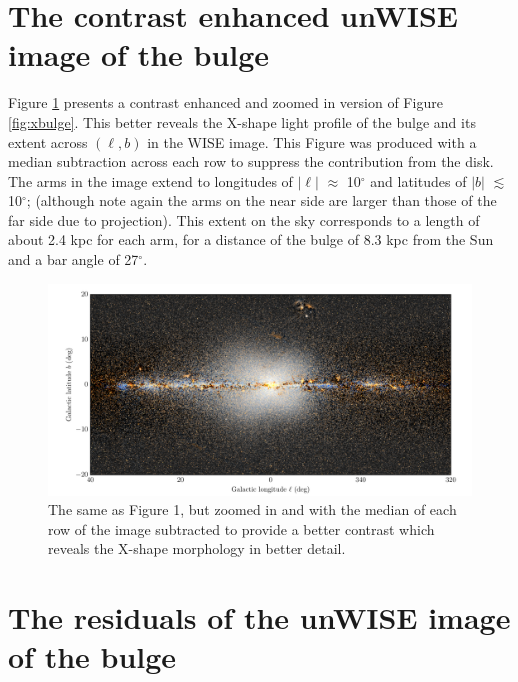 \documentclass[12pt, preprint]{aastex}
\begin{document}
\section{The contrast enhanced unWISE image of the bulge}

Figure \ref{fig:filt} presents a contrast enhanced and zoomed in version of Figure \ref{fig:xbulge}. This better reveals the X-shape light profile of the bulge and its extent across $(\ell,b)$ in the WISE image. This Figure was produced with a median subtraction across each row to suppress the contribution from the disk. The arms in the image extend to longitudes of $|\ell|$ $\approx$ 10$^\circ$ and latitudes of $|b|$ $\lesssim$ 10$^\circ$; (although note again the arms on the near side are larger than those of the far side due to projection). This extent on the sky corresponds to a length of about 2.4 kpc for each arm, for a distance of the bulge of 8.3 kpc from the Sun and a bar angle of 27$^\circ$.

\begin{figure}[h!]
\centering
        \includegraphics[width=\textwidth]{xbulge-01}
\caption{The same as Figure 1, but zoomed in and with the median of each row of the image subtracted to provide a better contrast which reveals the X-shape morphology in better detail.}
\label{fig:filt}
\end{figure}

\section{The residuals of the unWISE image of the bulge}
\end{document}
